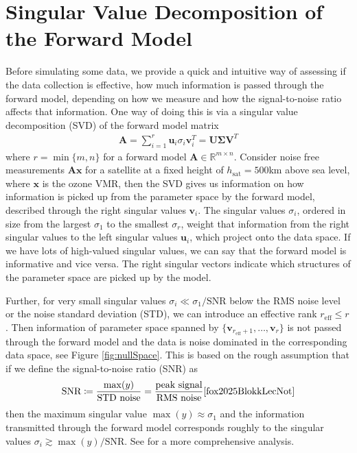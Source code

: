 \section{Singular Value Decomposition of the Forward Model}
\label{sec:SVD}
Before simulating some data, we provide a quick and intuitive way of assessing if the data collection is effective, how much information is passed through the forward model, depending on how we measure and how the signal-to-noise ratio affects that information.
One way of doing this is via a singular value decomposition (SVD) of the forward model matrix
\begin{align}
	\bm{A} = \sum_{i =1}^{r} \bm{u}_i  \sigma_i \bm{v}^T_i = \bm{U} \bm{\Sigma} \bm{V}^T
\end{align}
where $r = \min\{m,n\}$ for a forward model $\bm{A} \in \mathbb{R}^{m \times n}$.
Consider noise free measurements $\bm{A}\bm{x}$ for a satellite at a fixed height of $h_{\text{sat}} = 500$km above sea level, where $\bm{x}$ is the ozone VMR, then the SVD gives us information on how information is picked up from the parameter space by the forward model, described through the right singular values $\bm{v}_i$.
The singular values $\sigma_i $, ordered in size from the largest $\sigma_1$ to the smallest $\sigma_{r}$, weight that information from the right singular values to the left singular values $\bm{u}_i$, which project onto the data space.
If we have lots of high-valued singular values, we can say that the forward model is informative and vice versa.
The right singular vectors indicate which structures of the parameter space are picked up by the model.

Further, for very small singular values $\sigma_i \ll \sigma_1/\text{SNR}$ below the RMS noise level or the noise standard deviation (STD), we can introduce an effective rank $r_{\text{eff}} \leq r$.
Then information of parameter space spanned by $ \{\bm{v}_{r_{\text{eff}} +1}, \dots ,\bm{v}_r \}$ is not passed through the forward model and the data is noise dominated in the corresponding data space, see Figure \ref{fig:nullSpace}.
This is based on the rough assumption that if we define the signal-to-noise ratio (SNR) as
\begin{align}
	\text{SNR} \coloneqq \frac{\max(y)}{\text{STD noise}} = \frac{\text{peak signal}}{\text{RMS noise}} \text{\cite{fox2025BlokkLecNot}} \label{eq:SNR}
\end{align}
then the maximum singular value $\max(y) \approx \sigma_1$ and the information transmitted through the forward model corresponds roughly to the singular values $\sigma_i \gtrsim \max(y)/ \text{SNR}$.
See \cite{tan2016LecNot} for a more comprehensive analysis.

